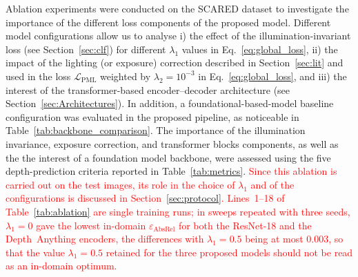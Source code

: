 \documentclass[a4paper,fleqn]{cas-dc}
\begin{document}
{Ablation experiments were conducted on the SCARED dataset to investigate the importance of the different loss components of the proposed model. Different model configurations allow us to analyse i) the effect of the illumination-invariant loss (see Section~\ref{sec:clf}) for different $\lambda_1$ values in Eq.~\eqref{eq:global_loss}, ii) the impact of the lighting (or exposure) correction described in Section~\ref{sec:lit} and used in the loss $\mathcal{L}_\textrm{PML}$ weighted by $\lambda_2 = 10^{-3}$ in Eq.~\eqref{eq:global_loss}, and iii) the interest of the transformer-based encoder–decoder architecture (see Section~\ref{sec:Architectures}). In addition, a foundational-based-model baseline configuration was evaluated in the proposed pipeline, as noticeable in Table~\ref{tab:backbone_comparison}. The importance of the illumination invariance, exposure correction, and transformer blocks components, as well as the the interest of a foundation model backbone, were assessed using the five depth-prediction criteria reported in Table~\ref{tab:metrics}. \textcolor{red}{Since this ablation is carried out on the test images, its role in the choice of $\lambda_1$ and of the configurations is discussed in Section~\ref{sec:protocol}. Lines~1--18 of Table~\ref{tab:ablation} are single training runs; in sweeps repeated with three seeds, $\lambda_1 = 0$ gave the lowest in-domain $\varepsilon_\textrm{AbsRel}$ for both the ResNet-18 and the Depth~Anything encoders, the differences with $\lambda_1 = 0.5$ being at most 0.003, so that the value $\lambda_1 = 0.5$ retained for the three proposed models should not be read as an in-domain optimum.}  

}
\end{document}
